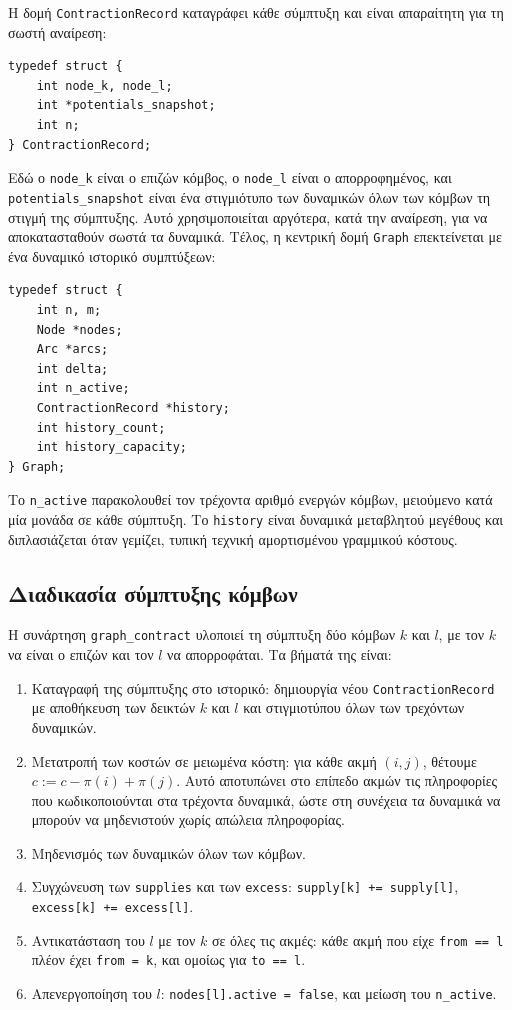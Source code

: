 \documentclass[11pt,a4paper,oneside]{report}
\let\oldsubsection\subsection
\renewcommand{\subsection}{\FloatBarrier\oldsubsection}
\begin{document}
Η δομή \texttt{ContractionRecord} καταγράφει κάθε σύμπτυξη και είναι απαραίτητη για τη σωστή αναίρεση:

\begin{verbatim}
typedef struct {
    int node_k, node_l;
    int *potentials_snapshot;
    int n;
} ContractionRecord;
\end{verbatim}

Εδώ ο \texttt{node\_k} είναι ο επιζών κόμβος, ο \texttt{node\_l} είναι ο απορροφημένος, και \texttt{potentials\_snapshot} είναι ένα στιγμιότυπο των δυναμικών όλων των κόμβων τη στιγμή της σύμπτυξης. Αυτό χρησιμοποιείται αργότερα, κατά την αναίρεση, για να αποκατασταθούν σωστά τα δυναμικά. Τέλος, η κεντρική δομή \texttt{Graph} επεκτείνεται με ένα δυναμικό ιστορικό συμπτύξεων:

\begin{verbatim}
typedef struct {
    int n, m;
    Node *nodes;
    Arc *arcs;
    int delta;
    int n_active;
    ContractionRecord *history;
    int history_count;
    int history_capacity;
} Graph;
\end{verbatim}

Το \texttt{n\_active} παρακολουθεί τον τρέχοντα αριθμό ενεργών κόμβων, μειούμενο κατά μία μονάδα σε κάθε σύμπτυξη. Το \texttt{history} είναι δυναμικά μεταβλητού μεγέθους και διπλασιάζεται όταν γεμίζει, τυπική τεχνική αμορτισμένου γραμμικού κόστους.

\subsection{Διαδικασία σύμπτυξης κόμβων}

Η συνάρτηση \texttt{graph\_contract} υλοποιεί τη σύμπτυξη δύο κόμβων $k$ και $l$, με τον $k$ να είναι ο επιζών και τον $l$ να απορροφάται. Τα βήματά της είναι:
\begin{enumerate}
  \item Καταγραφή της σύμπτυξης στο ιστορικό: δημιουργία νέου \texttt{ContractionRecord} με αποθήκευση των δεικτών $k$ και $l$ και στιγμιοτύπου όλων των τρεχόντων δυναμικών.
  \item Μετατροπή των κοστών σε μειωμένα κόστη: για κάθε ακμή $(i,j)$, θέτουμε $c := c - \pi(i) + \pi(j)$. Αυτό αποτυπώνει στο επίπεδο ακμών τις πληροφορίες που κωδικοποιούνται στα τρέχοντα δυναμικά, ώστε στη συνέχεια τα δυναμικά να μπορούν να μηδενιστούν χωρίς απώλεια πληροφορίας.
  \item Μηδενισμός των δυναμικών όλων των κόμβων.
  \item Συγχώνευση των \texttt{supplies} και των \texttt{excess}: \texttt{supply[k] += supply[l]}, \texttt{excess[k] += excess[l]}.
  \item Αντικατάσταση του $l$ με τον $k$ σε όλες τις ακμές: κάθε ακμή που είχε \texttt{from == l} πλέον έχει \texttt{from = k}, και ομοίως για \texttt{to == l}.
  \item Απενεργοποίηση του $l$: \texttt{nodes[l].active = false}, και μείωση του \texttt{n\_active}.
\end{enumerate}
\end{document}
